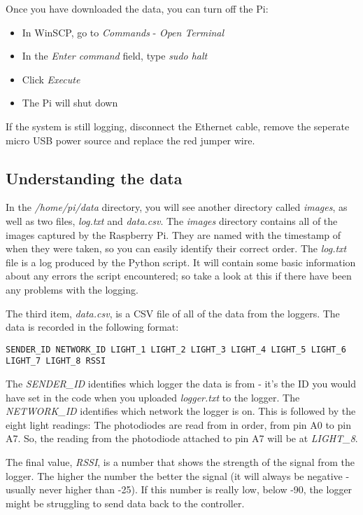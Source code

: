 \documentclass[10pt]{article}
\begin{document}
Once you have downloaded the data, you can turn off the Pi:

\begin{itemize}
 \item In WinSCP, go to \textit{Commands} - \textit{Open Terminal}
 \item In the \textit{Enter command} field, type \textit{sudo halt}
 \item Click \textit{Execute}
 \item The Pi will shut down
\end{itemize}

If the system is still logging, disconnect the Ethernet cable, remove the seperate micro USB power source and replace the red jumper wire. 

\subsection{Understanding the data}

In the \textit{/home/pi/data} directory, you will see another directory called \textit{images}, as well as two files, \textit{log.txt} and \textit{data.csv}. The \textit{images} directory contains all of the images captured by the Raspberry Pi. They are named with the timestamp of when they were taken, so you can easily identify their correct order. The \textit{log.txt} file is a log produced by the Python script. It will contain some basic information about any errors the script encountered; so take a look at this if there have been any problems with the logging. 

The third item, \textit{data.csv}, is a CSV file of all of the data from the loggers. The data is recorded in the following format: 

\begin{verbatim}
SENDER_ID NETWORK_ID LIGHT_1 LIGHT_2 LIGHT_3 LIGHT_4 LIGHT_5 LIGHT_6 LIGHT_7 LIGHT_8 RSSI
\end{verbatim}

The \textit{SENDER\_ID} identifies which logger the data is from - it's the ID you would have set in the code when you uploaded \textit{logger.txt} to the logger. The \textit{NETWORK\_ID} identifies which network the logger is on. This is followed by the eight light readings: The photodiodes are read from in order, from pin A0 to pin A7. So, the reading from the photodiode attached to pin A7 will be at \textit{LIGHT\_8}. 

The final value, \textit{RSSI}, is a number that shows the strength of the signal from the logger. The higher the number the better the signal (it will always be negative - usually never higher than -25). If this number is really low, below -90, the logger might be struggling to send data back to the controller.
\end{document}

